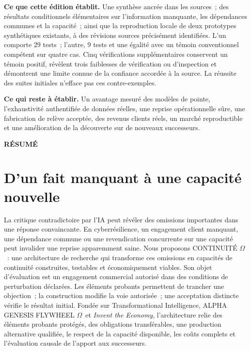 \documentclass[11pt,a4paper]{article}
\newcommand{\kicker}[1]{{\sffamily\small\bfseries\color{gold}\MakeUppercase{#1}}}
\newcommand{\om}{CONTINUITÉ $\Omega$}
\newcommand{\ti}{Transformational Intelligence}
\newcommand{\genesis}{ALPHA GENESIS FLYWHEEL $\Omega$}
\newcommand{\chapterpage}{\clearpage}
\begin{document}
\begin{scopebox}
\textbf{Ce que cette édition établit.} Une synthèse ancrée dans les sources~; des résultats conditionnels élémentaires sur l’information manquante, les dépendances communes et la capacité~; ainsi que la reproduction locale de deux prototypes synthétiques existants, à des révisions sources précisément identifiées. L’un comporte 29 tests~; l’autre, 9 tests et une égalité avec un témoin conventionnel compétent sur quatre cas. Cinq vérifications supplémentaires conservent un témoin positif, révèlent trois faiblesses de vérification ou d’inspection et démontrent une limite connue de la confiance accordée à la source. La réussite des suites initiales n’efface pas ces contre-exemples.\par
\textbf{Ce qui reste à établir.} Un avantage mesuré des modèles de pointe, l’exhaustivité authentifiée de données réelles, une reprise opérationnelle sûre, une fabrication de relève acceptée, des revenus clients réels, un marché reproductible et une amélioration de la découverte sur de nouveaux successeurs.
\end{scopebox}

\chapterpage
\kicker{Résumé}
\section*{D’un fait manquant à une capacité nouvelle}
La critique contradictoire par l’IA peut révéler des omissions importantes dans une réponse convaincante. En cyberrésilience, un engagement client manquant, une dépendance commune ou une revendication concurrente sur une capacité peut invalider une reprise apparemment saine. Nous proposons \om~: une architecture de recherche qui transforme ces omissions en capacités de continuité construites, testables et économiquement viables. Son objet d’évaluation est un engagement commercial autorisé dans des conditions de perturbation déclarées. Les éléments probants permettent de trancher une objection~; la construction modifie la voie autorisée~; une acceptation distincte vérifie le résultat initial. Fondée sur \ti, \genesis\ et \emph{Invent the Economy}, l’architecture relie des éléments probants protégés, des obligations transférables, une production alternative qualifiée, le respect de la capacité disponible, les coûts complets et l’évaluation causale de l’apport aux successeurs.
\end{document}
